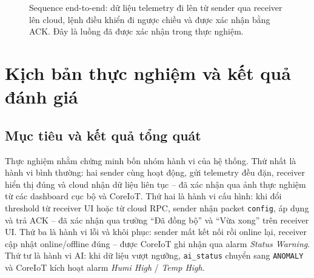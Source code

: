 \documentclass[12pt,a4paper]{report}
\begin{document}
\begin{figure}[H]
\centering
{}
\caption{Sequence end-to-end: dữ liệu telemetry đi lên từ sender qua receiver lên cloud, lệnh điều khiển đi ngược chiều và được xác nhận bằng ACK. Đây là luồng đã được xác nhận trong thực nghiệm.}
\label{fig:end-to-end}
\end{figure}

\section{Kịch bản thực nghiệm và kết quả đánh giá}

\subsection{Mục tiêu và kết quả tổng quát}
Thực nghiệm nhằm chứng minh bốn nhóm hành vi của hệ thống. Thứ nhất là hành vi bình thường: hai sender cùng hoạt động, gửi telemetry đều đặn, receiver hiển thị đúng và cloud nhận dữ liệu liên tục -- đã xác nhận qua ảnh thực nghiệm từ các dashboard cục bộ và CoreIoT. Thứ hai là hành vi cấu hình: khi đổi threshold từ receiver UI hoặc từ cloud RPC, sender nhận packet \texttt{config}, áp dụng và trả ACK -- đã xác nhận qua trường ``Đã đồng bộ'' và ``Vừa xong'' trên receiver UI. Thứ ba là hành vi lỗi và khôi phục: sender mất kết nối rồi online lại, receiver cập nhật online/offline đúng -- được CoreIoT ghi nhận qua alarm \textit{Status Warning}. Thứ tư là hành vi AI: khi dữ liệu vượt ngưỡng, \texttt{ai\_status} chuyển sang \texttt{ANOMALY} và CoreIoT kích hoạt alarm \textit{Humi High} / \textit{Temp High}.
\end{document}
